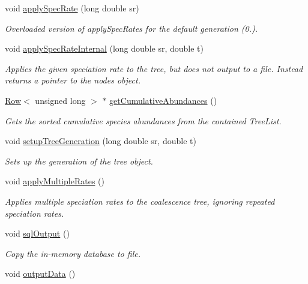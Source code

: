 \begin{DoxyCompactItemize}
void \hyperlink{class_tree_ab699328f13b22f48faa63a5638e907db}{apply\+Spec\+Rate} (long double sr)
\begin{DoxyCompactList}\small\item\em Overloaded version of apply\+Spec\+Rates for the default generation (0.). \end{DoxyCompactList}\item 
void \hyperlink{class_tree_ac89abe0404d05d0363258b72cb80700b}{apply\+Spec\+Rate\+Internal} (long double sr, double t)
\begin{DoxyCompactList}\small\item\em Applies the given speciation rate to the tree, but does not output to a file. Instead returns a pointer to the nodes object. \end{DoxyCompactList}\item 
\hyperlink{class_row}{Row}$<$ unsigned long $>$ $\ast$ \hyperlink{class_tree_a49a94b2218f7ae127a53af4a58d02b06}{get\+Cumulative\+Abundances} ()
\begin{DoxyCompactList}\small\item\em Gets the sorted cumulative species abundances from the contained Tree\+List. \end{DoxyCompactList}\item 
void \hyperlink{class_tree_a9997b98824a786d9843a3df40de1226a}{setup\+Tree\+Generation} (long double sr, double t)
\begin{DoxyCompactList}\small\item\em Sets up the generation of the tree object. \end{DoxyCompactList}\item 
void \hyperlink{class_tree_acfc7efdec999f6dbf2ac089514d22091}{apply\+Multiple\+Rates} ()
\begin{DoxyCompactList}\small\item\em Applies multiple speciation rates to the coalescence tree, ignoring repeated speciation rates. \end{DoxyCompactList}\item 
void \hyperlink{class_tree_a8cd3db7add1884ea53b0d98002d39cd3}{sql\+Output} ()
\begin{DoxyCompactList}\small\item\em Copy the in-\/memory database to file. \end{DoxyCompactList}\item 
void \hyperlink{class_tree_afdf680e187c25ed39d1e66542ce44cc3}{output\+Data} ()\hypertarget{class_tree_afdf680e187c25ed39d1e66542ce44cc3}{}\label{class_tree_afdf680e187c25ed39d1e66542ce44cc3}


\end{DoxyCompactItemize}

